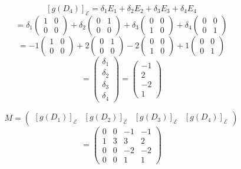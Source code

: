 \documentclass[a4paper]{article}
\theoremstyle{break}
\theoremstyle{break}
\theoremstyle{break}
\theoremstyle{break}
\begin{document}
\begin{enumerate}
        \[
          [g(D_4)]_{\mathcal{E}} = \delta_1 E_1 + \delta_2 E_2 + \delta_3 E_3 + \delta_4 E_4
        \]
        \[
        = \delta_1 \begin{pmatrix} 
          1 & 0\\
          0 & 0
        \end{pmatrix}
        + \delta_2 \begin{pmatrix} 
          0 & 1\\
          0 & 0
        \end{pmatrix}
        + \delta_3 \begin{pmatrix} 
          0 & 0\\
          1 & 0
        \end{pmatrix}
        + \delta_4 \begin{pmatrix} 
          0 & 0\\
          0 & 1
        \end{pmatrix}
        \]
        \[
          =
          -1 \begin{pmatrix} 
            1 & 0\\
            0 & 0
          \end{pmatrix}
          +2 \begin{pmatrix} 
            0 & 1\\
            0 & 0
          \end{pmatrix}
          -2 \begin{pmatrix} 
            0 & 0\\
            1 & 0
          \end{pmatrix}
          +1 \begin{pmatrix} 
            0 & 0\\
            0 & 1
          \end{pmatrix}
        \]
        \[
        = \begin{pmatrix} 
          \delta_1\\
          \delta_2\\
          \delta_3\\
          \delta_4
        \end{pmatrix}
        = \begin{pmatrix} 
          -1\\
          2\\
          -2\\
          1
        \end{pmatrix}
        \]

        \vspace{2em}
        \[
          M = \begin{pmatrix} \left[g(D_1)\right]_{\mathcal{E}} & \left[g(D_2)\right]_{\mathcal{E}} & \left[g(D_3)\right]_{\mathcal{E}} & \left[g(D_4)\right]_{\mathcal{E}} \end{pmatrix}
        \] 
        \[
        = \begin{pmatrix} 
          0 & 0 & -1 & -1\\
          1 & 3 & 3 & 2\\
          0 & 0 & -2 & -2\\
          0 & 0 & 1 & 1
        \end{pmatrix} 
        \] 


\end{enumerate}
\end{document}
